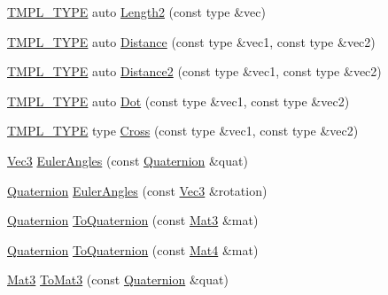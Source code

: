\begin{DoxyCompactItemize}
\item 
\hyperlink{_math_8h_a2618808fbb8e74983f8aaea56d02752b}{T\+M\+P\+L\+\_\+\+T\+Y\+PE} auto \hyperlink{namespace_g_f_w_1_1_math_a3d3542b2ef8f7c3b5edf3328b5a9259f}{Length2} (const type \&vec)
\item 
\hyperlink{_math_8h_a2618808fbb8e74983f8aaea56d02752b}{T\+M\+P\+L\+\_\+\+T\+Y\+PE} auto \hyperlink{namespace_g_f_w_1_1_math_ad1b76b5daaaabc2a45b27e2e55cda571}{Distance} (const type \&vec1, const type \&vec2)
\item 
\hyperlink{_math_8h_a2618808fbb8e74983f8aaea56d02752b}{T\+M\+P\+L\+\_\+\+T\+Y\+PE} auto \hyperlink{namespace_g_f_w_1_1_math_a3bc804252a887404d0879dd64b1974b1}{Distance2} (const type \&vec1, const type \&vec2)
\item 
\hyperlink{_math_8h_a2618808fbb8e74983f8aaea56d02752b}{T\+M\+P\+L\+\_\+\+T\+Y\+PE} auto \hyperlink{namespace_g_f_w_1_1_math_a33158d68edc21df0fa9cd262091ab2b7}{Dot} (const type \&vec1, const type \&vec2)
\item 
\hyperlink{_math_8h_a2618808fbb8e74983f8aaea56d02752b}{T\+M\+P\+L\+\_\+\+T\+Y\+PE} type \hyperlink{namespace_g_f_w_1_1_math_a82f36ce6493d99568fb628e9b5d162da}{Cross} (const type \&vec1, const type \&vec2)
\item 
\hyperlink{namespace_g_f_w_1_1_math_a3c3a254de27c8bbb8434611ce231c378}{Vec3} \hyperlink{namespace_g_f_w_1_1_math_ae5b20e068bdf3e5a1eb24127012b76af}{Euler\+Angles} (const \hyperlink{namespace_g_f_w_1_1_math_ae0c2a9f7efcd94286b950a2ddea66ee0}{Quaternion} \&quat)
\item 
\hyperlink{namespace_g_f_w_1_1_math_ae0c2a9f7efcd94286b950a2ddea66ee0}{Quaternion} \hyperlink{namespace_g_f_w_1_1_math_ad511965c738b842759490b4b67ab1f36}{Euler\+Angles} (const \hyperlink{namespace_g_f_w_1_1_math_a3c3a254de27c8bbb8434611ce231c378}{Vec3} \&rotation)
\item 
\hyperlink{namespace_g_f_w_1_1_math_ae0c2a9f7efcd94286b950a2ddea66ee0}{Quaternion} \hyperlink{namespace_g_f_w_1_1_math_a687d2ab6e9ec6a46e494f038adadafac}{To\+Quaternion} (const \hyperlink{namespace_g_f_w_1_1_math_ab5dfc77d541d85c8e2a42f6e645fba70}{Mat3} \&mat)
\item 
\hyperlink{namespace_g_f_w_1_1_math_ae0c2a9f7efcd94286b950a2ddea66ee0}{Quaternion} \hyperlink{namespace_g_f_w_1_1_math_a49470162bfae587f39a7f4e0a9e9749d}{To\+Quaternion} (const \hyperlink{namespace_g_f_w_1_1_math_a313d630ab7d0ef3b109bb39401962fb1}{Mat4} \&mat)
\item 
\hyperlink{namespace_g_f_w_1_1_math_ab5dfc77d541d85c8e2a42f6e645fba70}{Mat3} \hyperlink{namespace_g_f_w_1_1_math_a15f8d33ca23865a5df213764fd00b3cb}{To\+Mat3} (const \hyperlink{namespace_g_f_w_1_1_math_ae0c2a9f7efcd94286b950a2ddea66ee0}{Quaternion} \&quat)

\end{DoxyCompactItemize}
